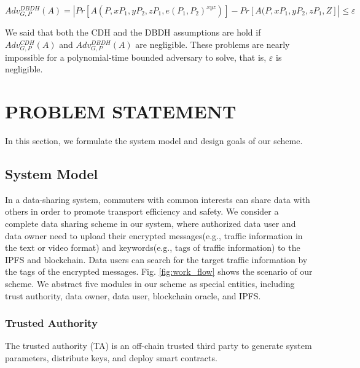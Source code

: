 \documentclass[journal,10pt]{IEEEtran}
\begin{document}
\begin{center}
$Adv_{G,P}^{DBDH}(A) = |Pr[A(P,xP_1,yP_2,zP_1,e(P_1,P_2)^{xyz})]-Pr[A(P,xP_1,yP_2,zP_1,Z]| \leq \varepsilon$
\end{center}

We said that both the CDH and the DBDH assumptions are hold if %
$Adv_{G,P}^{CDH}(A)$ and $Adv_{G,P}^{DBDH}(A)$ are negligible. These problems are nearly impossible for a polynomial-time bounded adversary to solve, that is, $\varepsilon$ is negligible.


\section{PROBLEM STATEMENT}
In this section, we formulate the system model and design goals of our scheme.
\subsection{System Model} 
In a data-sharing system, commuters with common interests can share data with others in order to promote transport efficiency and safety. We consider a complete data sharing scheme in our system, where authorized data user and data owner need to upload their encrypted messages(e.g., traffic information in the text or video format) and keywords(e.g., tags of traffic information) to the IPFS and blockchain. Data users can search for the target traffic information by the tags of the encrypted messages. Fig. \ref{fig:work_flow} shows the scenario of our scheme. We abstract five modules in our scheme as special entities, including trust authority, data owner, data user, blockchain oracle, and IPFS.

\subsubsection{\textbf{Trusted Authority}}
The trusted authority (TA) is an off-chain trusted third party to generate system parameters, distribute keys, and deploy smart contracts.
\end{document}
